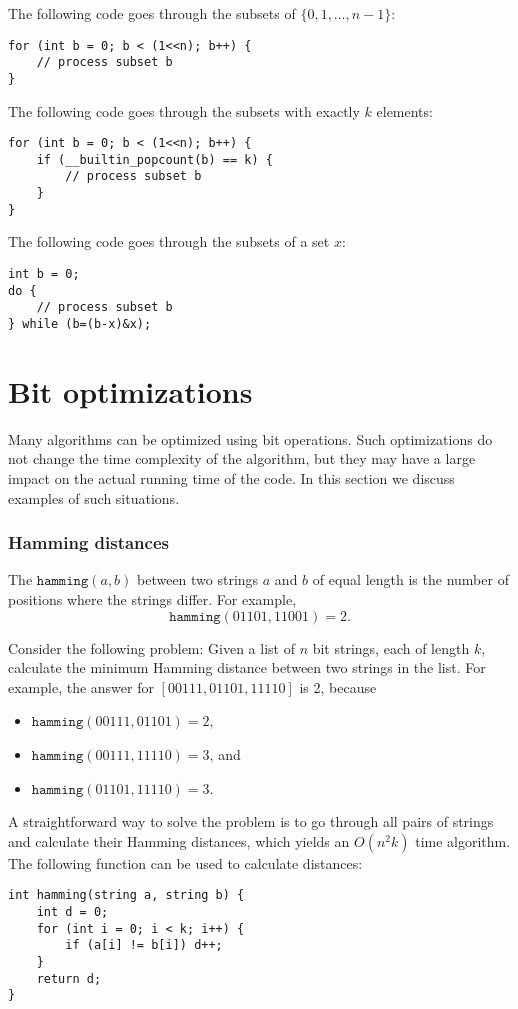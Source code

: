 The following code goes through
the subsets of $\{0,1,\ldots,n-1\}$:

\begin{lstlisting}
for (int b = 0; b < (1<<n); b++) {
    // process subset b
}
\end{lstlisting}
The following code goes through
the subsets with exactly $k$ elements:
\begin{lstlisting}
for (int b = 0; b < (1<<n); b++) {
    if (__builtin_popcount(b) == k) {
        // process subset b
    }
}
\end{lstlisting}
The following code goes through the subsets
of a set $x$:
\begin{lstlisting}
int b = 0;
do {
    // process subset b
} while (b=(b-x)&x);
\end{lstlisting}

\section{Bit optimizations}

Many algorithms can be optimized using
bit operations.
Such optimizations do not change the
time complexity of the algorithm,
but they may have a large impact
on the actual running time of the code.
In this section we discuss examples
of such situations.

\subsubsection{Hamming distances}

The 
$\texttt{hamming}(a,b)$ between two
strings $a$ and $b$ of equal length is
the number of positions where the strings differ.
For example,
\[\texttt{hamming}(01101,11001)=2.\]

Consider the following problem: Given
a list of $n$ bit strings, each of length $k$,
calculate the minimum Hamming distance
between two strings in the list.
For example, the answer for $[00111,01101,11110]$
is 2, because
\begin{itemize}[noitemsep]
\item $\texttt{hamming}(00111,01101)=2$,
\item $\texttt{hamming}(00111,11110)=3$, and
\item $\texttt{hamming}(01101,11110)=3$.
\end{itemize}

A straightforward way to solve the problem is
to go through all pairs of strings and calculate
their Hamming distances,
which yields an $O(n^2 k)$ time algorithm.
The following function can be used to
calculate distances:
\begin{lstlisting}
int hamming(string a, string b) {
    int d = 0;
    for (int i = 0; i < k; i++) {
        if (a[i] != b[i]) d++;
    }
    return d;
}
\end{lstlisting}


